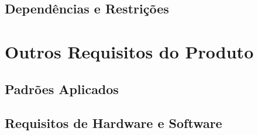 \documentclass{article}
\begin{document}
\subsection{Dependências e Restrições}

\section{Outros Requisitos do Produto}

\subsection{Padrões Aplicados}

\subsection{Requisitos de Hardware e Software}

% 
% 
\end{document}
